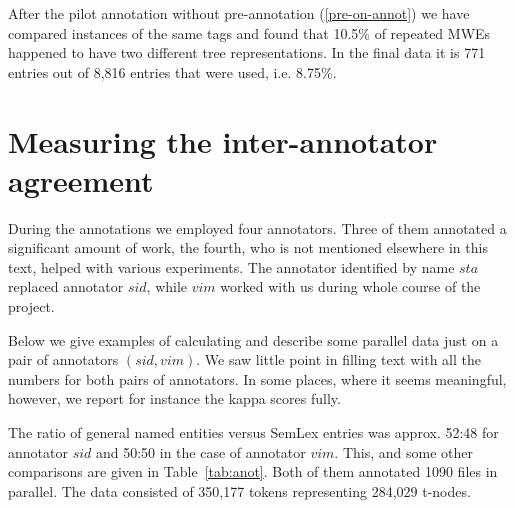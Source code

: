 
After the pilot annotation without pre-annotation (\ref{pre-on-annot})  we have compared instances of the same tags and found that 10.5\% of repeated MWEs happened to have two different tree representations. In the final data it is 771 entries out of 8,816 entries that were used, i.e. 8.75\%.



\section{Measuring the inter-annotator agreement}
\label{sec:annot:analysis}
During the annotations we employed four annotators. Three of them annotated a significant amount of work, the fourth, who is not mentioned elsewhere in this text, helped with various experiments. The annotator identified by name $sta$ replaced annotator $sid$, while $vim$ worked with us during whole course of the project. 

Below we give examples of calculating and describe some parallel data just on a pair of annotators $(sid, vim)$. We saw little point in filling text with all the numbers for both pairs of annotators. In some places, where it seems meaningful, however, we report for instance the kappa scores fully.

The ratio of general named entities versus SemLex entries was approx. 52:48 for annotator $sid$ and 50:50 in the case of annotator $vim$. This, and some other comparisons are given in Table~\ref{tab:anot}. Both of them annotated 1090 files in parallel. The data consisted of  350,177 tokens representing 284,029 t-nodes.

